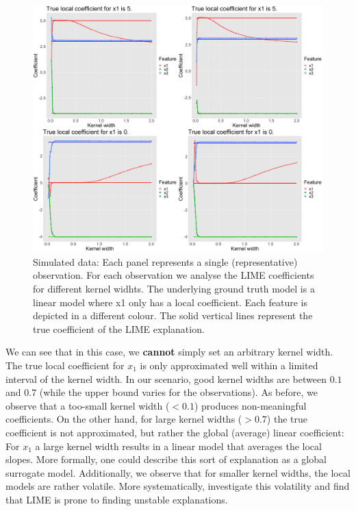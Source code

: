 \documentclass[
]{krantz}
\begin{document}
\begin{figure}

{\centering \includegraphics[width=0.99\linewidth]{images/04-09-10} 

}

\caption{Simulated data: Each panel represents a single (representative) observation. For each observation we analyse the LIME coefficients for different kernel widhts. The underlying ground truth model is a linear model where x1 only has a local coefficient. Each feature is depicted in a different colour. The solid vertical lines represent the true coefficient of the LIME explanation.}\label{fig:lime-fig10}
\end{figure}

We can see that in this case, we \textbf{cannot} simply set an arbitrary kernel width.
The true local coefficient for \(x_1\) is only approximated well within a limited interval of the kernel width.
In our scenario, good kernel widths are between \(0.1\) and \(0.7\) (while the upper bound varies for the observations).
As before, we observe that a too-small kernel width (\(< 0.1\)) produces non-meaningful coefficients.
On the other hand, for large kernel widths (\(> 0.7\)) the true coefficient is not approximated, but rather the global (average) linear coefficient:
For \(x_1\) a large kernel width results in a linear model that averages the local slopes.
More formally, one could describe this sort of explanation as a global surrogate model.
Additionally, we observe that for smaller kernel widths, the local models are rather volatile.
More systematically, \citet{alvarez2018robustness} investigate this volatility and find that LIME is prone to finding unstable explanations.
\end{document}
